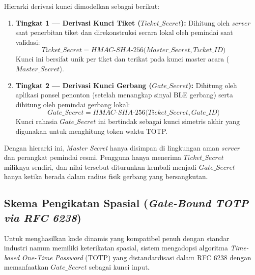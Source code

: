 Hierarki derivasi kunci dimodelkan sebagai berikut:
\begin{enumerate}
    \item \textbf{Tingkat 1 — Derivasi Kunci Tiket ($Ticket\_Secret$):}
    Dihitung oleh \textit{server} saat penerbitan tiket dan direkonstruksi secara lokal oleh pemindai saat validasi:
    \begin{equation}
        Ticket\_Secret = HMAC\text{-}SHA\text{-}256\Big(Master\_Secret, Ticket\_ID\Big)
    \end{equation}
    Kunci ini bersifat unik per tiket dan terikat pada kunci master acara ($Master\_Secret$).
    \item \textbf{Tingkat 2 — Derivasi Kunci Gerbang ($Gate\_Secret$):}
    Dihitung oleh aplikasi ponsel penonton (setelah menangkap sinyal BLE gerbang) serta dihitung oleh pemindai gerbang lokal:
    \begin{equation}
        Gate\_Secret = HMAC\text{-}SHA\text{-}256\Big(Ticket\_Secret, Gate\_ID\Big)
    \end{equation}
    Kunci rahasia $Gate\_Secret$ ini bertindak sebagai kunci simetris akhir yang digunakan untuk menghitung token waktu TOTP.
\end{enumerate}

Dengan hierarki ini, \textit{Master Secret} hanya disimpan di lingkungan aman \textit{server} dan perangkat pemindai resmi. Pengguna hanya menerima $Ticket\_Secret$ miliknya sendiri, dan nilai tersebut diturunkan kembali menjadi $Gate\_Secret$ hanya ketika berada dalam radius fisik gerbang yang bersangkutan.

\subsection{Skema Pengikatan Spasial (\textit{Gate-Bound TOTP via RFC 6238})}
Untuk menghasilkan kode dinamis yang kompatibel penuh dengan standar industri namun memiliki keterikatan spasial, sistem mengadopsi algoritma \textit{Time-based One-Time Password} (TOTP) yang distandardisasi dalam RFC 6238 dengan memanfaatkan $Gate\_Secret$ sebagai kunci input.

